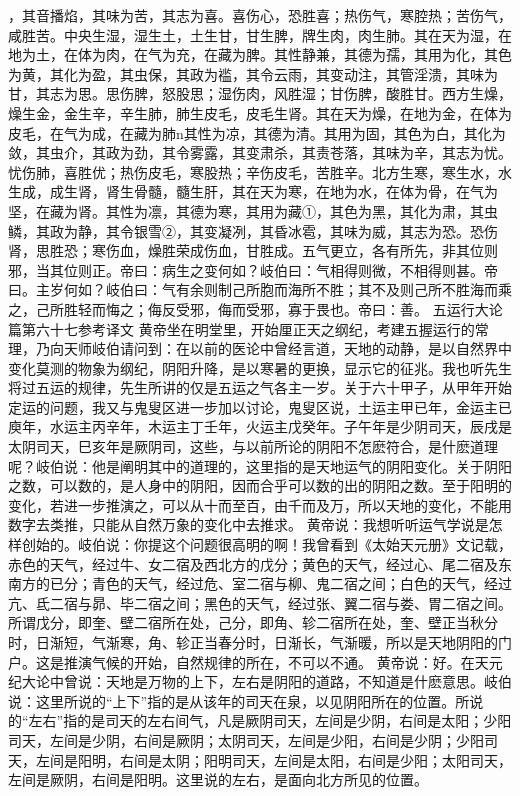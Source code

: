\documentclass[a4paper,12pt,UTF8,twoside]{ctexbook}
\begin{document}
，其音播焰，其味为苦，其志为喜。喜伤心，恐胜喜；热伤气，寒腔热；苦伤气，咸胜苦。中央生湿，湿生土，土生甘，甘生脾，牌生肉，肉生肺。其在天为湿，在地为土，在体为肉，在气为充，在藏为脾。其性静兼，其德为孺，其用为化，其色为黄，其化为盈，其虫保，其政为褴，其令云雨，其变动注，其管淫溃，其味为甘，其志为思。思伤脾，怒股思；湿伤肉，风胜湿；甘伤脾，酸胜甘。西方生燥，燥生金，金生辛，辛生肺，肺生皮毛，皮毛生肾。其在天为燥，在地为金，在体为皮毛，在气为成，在藏为肺n其性为凉，其德为清。其用为固，其色为白，其化为敛，其虫介，其政为劲，其令雾露，其变肃杀，其责苍落，其味为辛，其志为忧。忧伤肺，喜胜优；热伤皮毛，寒股热；辛伤皮毛，苦胜辛。北方生寒，寒生水，水生成，成生肾，肾生骨髓，髓生肝，其在天为寒，在地为水，在体为骨，在气为坚，在藏为肾。其性为凛，其德为寒，其用为藏①，其色为黑，其化为肃，其虫鳞，其政为静，其令银雪②，其变凝冽，其昏冰雹，其味为威，其志为恐。恐伤肾，思胜恐；寒伤血，燥胜荣成伤血，甘胜成。五气更立，各有所先，非其位则邪，当其位则正。帝曰：病生之变何如？岐伯曰：气相得则微，不相得则甚。帝曰。主岁何如？岐伯曰：气有余则制己所胞而海所不胜；其不及则己所不胜海而乘之，己所胜轻而悔之；侮反受邪，侮而受邪，寡于畏也。帝曰：善。
五运行大论篇第六十七参考译文
黄帝坐在明堂里，开始厘正天之纲纪，考建五握运行的常理，乃向天师岐伯请问到：在以前的医论中曾经言道，天地的动静，是以自然界中变化莫测的物象为纲纪，阴阳升降，是以寒暑的更换，显示它的征兆。我也听先生将过五运的规律，先生所讲的仅是五运之气各主一岁。关于六十甲子，从甲年开始定运的问题，我又与鬼叟区进一步加以讨论，鬼叟区说，土运主甲已年，金运主已庾年，水运主丙辛年，木运主丁壬年，火运主戊癸年。子午年是少阴司天，辰戌是太阴司天，巳亥年是厥阴司，这些，与以前所论的阴阳不怎麽符合，是什麽道理呢？岐伯说：他是阐明其中的道理的，这里指的是天地运气的阴阳变化。关于阴阳之数，可以数的，是人身中的阴阳，因而合乎可以数的出的阴阳之数。至于阳明的变化，若进一步推演之，可以从十而至百，由千而及万，所以天地的变化，不能用数字去类推，只能从自然万象的变化中去推求。
黄帝说：我想听听运气学说是怎样创始的。岐伯说：你提这个问题很高明的啊！我曾看到《太始天元册》文记载，赤色的天气，经过牛、女二宿及西北方的戊分；黄色的天气，经过心、尾二宿及东南方的已分；青色的天气，经过危、室二宿与柳、鬼二宿之间；白色的天气，经过亢、氐二宿与昴、毕二宿之间；黑色的天气，经过张、翼二宿与娄、胃二宿之间。所谓戊分，即奎、壁二宿所在处，己分，即角、轸二宿所在处，奎、壁正当秋分时，日渐短，气渐寒，角、轸正当春分时，日渐长，气渐暖，所以是天地阴阳的门户。这是推演气候的开始，自然规律的所在，不可以不通。
黄帝说：好。在天元纪大论中曾说：天地是万物的上下，左右是阴阳的道路，不知道是什麽意思。岐伯说：这里所说的“上下”指的是从该年的司天在泉，以见阴阳所在的位置。所说的“左右”指的是司天的左右间气，凡是厥阴司天，左间是少阴，右间是太阳；少阳司天，左间是少阴，右间是厥阴；太阴司天，左间是少阳，右间是少阴；少阳司天，左间是阳明，右间是太阴；阳明司天，左间是太阳，右间是少阳；太阳司天，左间是厥阴，右间是阳明。这里说的左右，是面向北方所见的位置。
\end{document}
